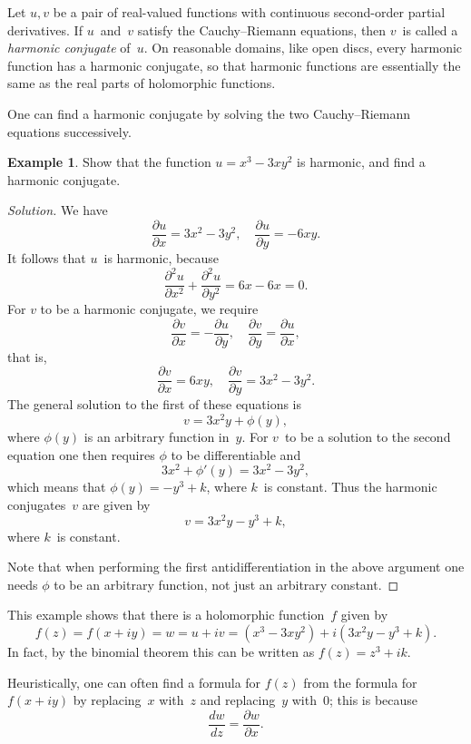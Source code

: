 \documentclass{amsproc}
\theoremstyle{definition}
\newtheorem{example}[theorem]{Example}
\newenvironment{solution}{\begin{proof}[Solution]}{\end{proof}}
\theoremstyle{remark}
\renewcommand{\d}{\partial}
\DeclareMathOperator{\C}{\mathbb{C}}
\numberwithin{equation}{section}
\begin{document}
Let $ u,v $ be a pair of real-valued functions with continuous second-order partial derivatives. If $ u $~and~$ v $ satisfy the Cauchy--Riemann equations,
then $ v $~is called a \emph{harmonic conjugate} of~$ u $. On reasonable domains, like open discs,
every harmonic function has a harmonic conjugate, so that harmonic functions are essentially the same as the real parts of holomorphic functions.

One can find a harmonic conjugate by solving the two Cauchy--Riemann equations successively.

\begin{example} \label{CME5.2}
Show that the function $ u = x^3 - 3x y^2 $ is harmonic, and find a harmonic conjugate.
\end{example}

\begin{solution}
We have
$$
\dfrac{\d u}{\d x} = 3x^2 - 3y^2, \quad \dfrac{\d u}{\d y} = -6xy.
$$
It follows that $ u $~is harmonic, because
$$
\dfrac{\d^2 u}{\d x^2} + \dfrac{\d^2 u}{\d y^2} = 6x - 6x = 0.
$$
For $ v $ to be a harmonic conjugate, we require
$$
\dfrac{\d v}{\d x} = -\dfrac{\d u}{\d y}, \quad \dfrac{\d v}{\d y} = \dfrac{\d u}{\d x},
$$
that is,
$$
\dfrac{\d v}{\d x} = 6xy, \quad \dfrac{\d v}{\d y} = 3x^2 - 3y^2.
$$
The general solution to the first of these equations is
$$
v = 3x^2 y + \phi(y),
$$
where $ \phi(y) $ is an arbitrary function in~$ y $. For $ v $~to be a solution to the second equation one then requires $ \phi $ to be differentiable and
$$
3x^2 + \phi'(y) = 3x^2 - 3y^2,
$$
which means that $ \phi(y) = -y^3 + k $, where $ k $~is constant. Thus the harmonic conjugates~$ v $ are given by
$$
v = 3x^2y - y^3 + k,
$$
where $ k $~is constant.

Note that when performing the first antidifferentiation in the above argument one needs $ \phi $ to be an arbitrary function, not just an arbitrary constant.
\end{solution}

This example shows that there is a holomorphic function~$ f $ given by
$$
f(z) = f(x + iy) = w = u + iv = (x^3 - 3xy^2) + i(3x^2y - y^3 + k).
$$
In fact, by the binomial theorem this can be written as $ f(z) = z^3 + ik $.

Heuristically, one can often find a formula for $ f(z) $ from the formula for $ f(x + iy) $ by replacing~$ x $ with~$ z $
and replacing~$ y $ with~$ 0 $; this is because
$$
\dfrac{dw}{dz} = \dfrac{\d w}{\d x}.
$$
\end{document}
